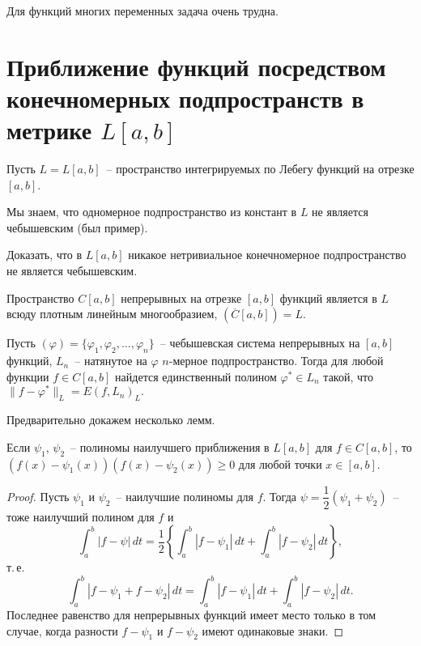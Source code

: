 \begin{Remark}
Для функций многих переменных задача очень трудна.
\end{Remark}


\section{Приближение функций посредством\\ конечномерных подпространств в метрике $L[a,b]$}

Пусть $L=L[a,b]$~-- пространство интегрируемых по Лебегу функций на отрезке $[a,b]$.

Мы знаем, что одномерное подпространство из констант в $L$ не является чебышевским
(был пример).

\begin{ex}
Доказать, что в $L[a,b]$ никакое нетривиальное конечномерное подпространство
не является чебышевским.
\end{ex}

Пространство $C[a,b]$ непрерывных на отрезке $[a,b]$ функций является в $L$
всюду плотным линейным многообразием, $(\overline C[a,b])=L$.

\begin{teo}[Д.\,Джексон]
Пусть $(\varphi) = \{\varphi_1,\varphi_2,\ldots,\varphi_n\}$~--
чебышевская система непрерывных на $[a,b]$ функций, $L_n$~-- натянутое на
$\varphi$ $n$-мерное подпространство. Тогда для любой
функции $f\in C[a,b]$ найдется единственный полином $\varphi^*\in L_n$ такой, что
$\|f-\varphi^*\|_L=E(f,L_n)_L.$
\end{teo}

Предварительно докажем несколько лемм.

\begin{lemma}\label{l13-1}
Если $\psi_1$, $\psi_2$~-- полиномы наилучшего приближения {в $L[a,b]$ для}
{$f \in C[a,b]$}, то $(f(x)-\psi_1(x))(f(x)-\psi_2(x))\ge0$
для любой точки $x\in[a,b]$.
\end{lemma}

\begin{proof}
Пусть $\psi_1$ и $\psi_2$~-- наилучшие полиномы для $f$. Тогда
$\psi=\dfrac12(\psi_1+\psi_2)$~-- тоже наилучший полином для $f$ и
$$
\int_a^b |f-\psi|\,dt = \frac12\left\{ \int_a^b |f-\psi_1|\,dt + \int_a^b
|f-\psi_2|\,dt \right\},
$$
т.\,е.
$$
\int_a^b |f-\psi_1+f-\psi_2|\,dt =
\int_a^b |f-\psi_1|\,dt+ \int_a^b |f-\psi_2|\,dt.
$$
Последнее равенство {для непрерывных функций} имеет место только
в том случае, когда разности $f-\psi_1$ и $f-\psi_2$ имеют одинаковые знаки.
\end{proof}

